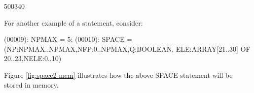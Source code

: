 \begin{fast_picture}{500}{340}
               \nextDbox{}
               \nextDbox{}
               \nextDbox{}
               \nextDbox{}
          \nextCbox{}
          \nextCbox{}
          \nextCbox{}
          \nextCbox{}
          \nextCbox{}
   \nextAbox{}
      \nextBbox{}
      \nextBbox{}
   \nextAbox{}
\nextFbox{}
      \nextBbox{}
      \nextBbox{}
      \nextBbox{}
\nextFbox{}
\end{fast_picture}

For another example of a  statement, consider:
\begin{logfileexample}
(00009): NPMAX = 5;
(00010): SPACE = (NP:NPMAX..NPMAX,NFP:0..NPMAX,Q:BOOLEAN,
                  ELE:ARRAY[21..30] OF 20..23,NELE:0..10)
\end{logfileexample}

Figure \ref{fig:space2-mem} illustrates how the above SPACE statement will be
stored in memory.

